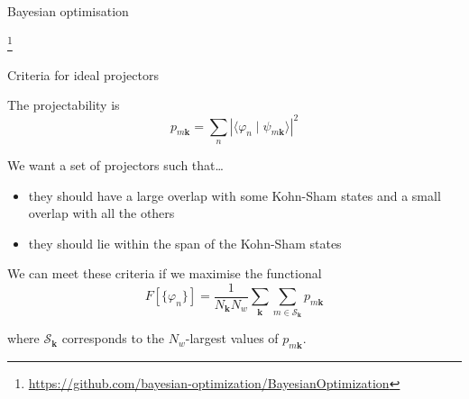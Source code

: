 \documentclass[xcolor=table,aspectratio=169]{beamer}
\newcommand\blfootnote[1]{%
  \begingroup
  \renewcommand\thefootnote{}\footnote{#1}%
  \addtocounter{footnote}{-1}%
  \endgroup
}
\numberwithin{equation}{section}
\begin{document}
\begin{frame}{Bayesian optimisation}
\begin{center}
   \end{center}

   \blfootnote{\url{https://github.com/bayesian-optimization/BayesianOptimization}}
\end{frame}

\begin{frame}{Criteria for ideal projectors}

   The projectability is
   \begin{equation*}
      p_{m\mathbf{k}} = \sum_n |\langle \varphi_n \mid \psi_{m\mathbf{k}}\rangle |^2
   \end{equation*}

   We want a set of projectors such that\dots
   \begin{itemize}
      \item they should have a large overlap with some Kohn-Sham states and a small overlap with all the others%
      \item they should lie within the span of the Kohn-Sham states%
   \end{itemize}

   We can meet these criteria if we maximise the functional
   \begin{equation*}
      F[\{\varphi_n\}] = \frac{1}{N_\mathbf{k} N_w} \sum_{\mathbf{k}} \sum_{m \in \mathcal{S}_\mathbf{k}} p_{m\mathbf{k}}
   \end{equation*}

   where $\mathcal{S}_\mathbf{k}$ corresponds to the $N_w$-largest values of $p_{m\mathbf{k}}$.
\end{frame}
\end{document}
